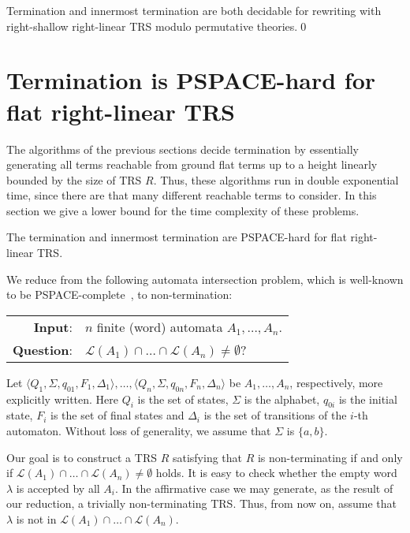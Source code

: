 \documentclass{LMCS}
\theoremstyle{plain}
\begin{document}
\begin{thm}
Termination and innermost termination are both
decidable for rewriting with right-shallow right-linear TRS 
modulo permutative theories.\qed
\end{thm}

\section{Termination is PSPACE-hard for flat right-linear TRS}\label{sec-hardness}

\noindent The algorithms of the previous sections decide termination by 
essentially generating
all terms reachable from ground flat terms up to a height
linearly bounded by the size of TRS $R$. Thus, these algorithms
run in double exponential time, since there are that
many different reachable terms to consider. In this section
we give a lower bound for the time complexity of
these problems.

\begin{thm}
The termination and innermost termination are PSPACE-hard for
flat right-linear TRS.
\end{thm}
\proof
We reduce from the following automata intersection
problem, which is
well-known to be PSPACE-complete~\cite{Kozen77}, to non-termination:
\\
\begin{tabular}{rl}
{\bf Input}: & $n$ finite (word) automata $A_1,\ldots,A_n$.\\
{\bf Question}: & ${\mathcal L}(A_1)\cap\ldots\cap{\mathcal
L}(A_n)\not=\emptyset$?
\end{tabular}

Let $\langle Q_1,\Sigma,q_{01},F_1,\Delta_1\rangle,\ldots,
\langle Q_n,\Sigma,q_{0n},F_n,\Delta_n\rangle$ be $A_1,\ldots,A_n$,
respectively, more explicitly written. 
Here 
$Q_i$ is the set of states,
$\Sigma$ is the alphabet,
$q_{0i}$ is the initial state,
$F_i$ is the set of final states and
$\Delta_i$ is the set of transitions of the $i$-th automaton.
Without loss of generality, we assume that $\Sigma$ is $\{a,b\}$.

Our goal is to construct a TRS $R$ satisfying that
$R$ is non-terminating if and only if
${\mathcal L}(A_1)\cap\ldots\cap{\mathcal
L}(A_n)\not=\emptyset$ holds.
It is easy to check whether the empty word $\lambda$ is
accepted by all $A_i$. In the affirmative case we may generate,
as the result of our reduction, a trivially non-terminating TRS.
Thus, from now on, assume that $\lambda$ is not in
${\mathcal L}(A_1)\cap\ldots\cap{\mathcal L}(A_n)$.
\end{document}
